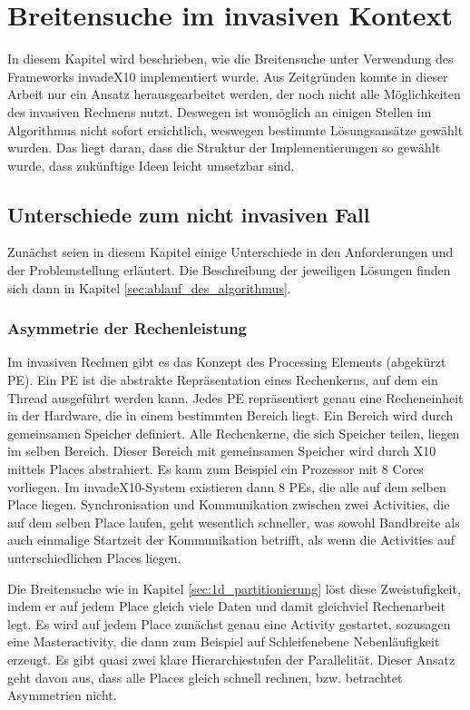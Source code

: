 
\chapter{Breitensuche im invasiven Kontext} %
\label{cha:breitensuche_im_invasiven_kontext}
In diesem Kapitel wird beschrieben, wie die Breitensuche unter Verwendung des Frameworks invadeX10 implementiert wurde. Aus Zeitgründen konnte in dieser Arbeit nur ein Ansatz herausgearbeitet werden, der noch nicht alle Möglichkeiten des invasiven Rechnens nutzt. Deswegen ist womöglich an einigen Stellen im Algorithmus nicht sofort ersichtlich, weswegen bestimmte Lösungsansätze gewählt wurden. Das liegt daran, dass die Struktur der Implementierungen so gewählt wurde, dass zukünftige Ideen leicht umsetzbar sind.

\section{Unterschiede zum nicht invasiven Fall} %
\label{sec:unterschiede_zum_nicht_invasiven_fall}
Zunächst seien in diesem Kapitel einige Unterschiede in den Anforderungen und der Problemstellung erläutert. Die Beschreibung der jeweiligen Lösungen finden sich dann in Kapitel \ref{sec:ablauf_des_algorithmus}.

\subsection{Asymmetrie der Rechenleistung} %
\label{sub:asymmetrie_der_rechenleistung}
Im invasiven Rechnen gibt es das Konzept des Processing Elements (abgekürzt PE). Ein PE ist die abstrakte Repräsentation eines Rechenkerns, auf dem ein Thread ausgeführt werden kann. Jedes PE repräsentiert genau eine Recheneinheit in der Hardware, die in einem bestimmten Bereich liegt. Ein Bereich wird durch gemeinsamen Speicher definiert. Alle Rechenkerne, die sich Speicher teilen, liegen im selben Bereich. Dieser Bereich mit gemeinsamen Speicher wird durch X10 mittels Places abstrahiert. Es kann zum Beispiel ein Prozessor mit 8 Cores vorliegen. Im invadeX10-System existieren dann 8 PEs, die alle auf dem selben Place liegen. Synchronisation und Kommunikation zwischen zwei Activities, die auf dem selben Place laufen, geht wesentlich schneller, was sowohl Bandbreite als auch einmalige Startzeit der Kommunikation betrifft, als wenn die Activities auf unterschiedlichen Places liegen. 

Die Breitensuche wie in Kapitel \ref{sec:1d_partitionierung} löst diese Zweistufigkeit, indem er auf jedem Place gleich viele Daten und damit gleichviel Rechenarbeit legt. Es wird auf jedem Place zunächst genau eine Activity gestartet, sozusagen eine Masteractivity, die dann zum Beispiel auf Schleifenebene Nebenläufigkeit erzeugt. Es gibt quasi zwei klare Hierarchiestufen der Parallelität. Dieser Ansatz geht davon aus, dass alle Places gleich schnell rechnen, bzw. betrachtet Asymmetrien nicht.

